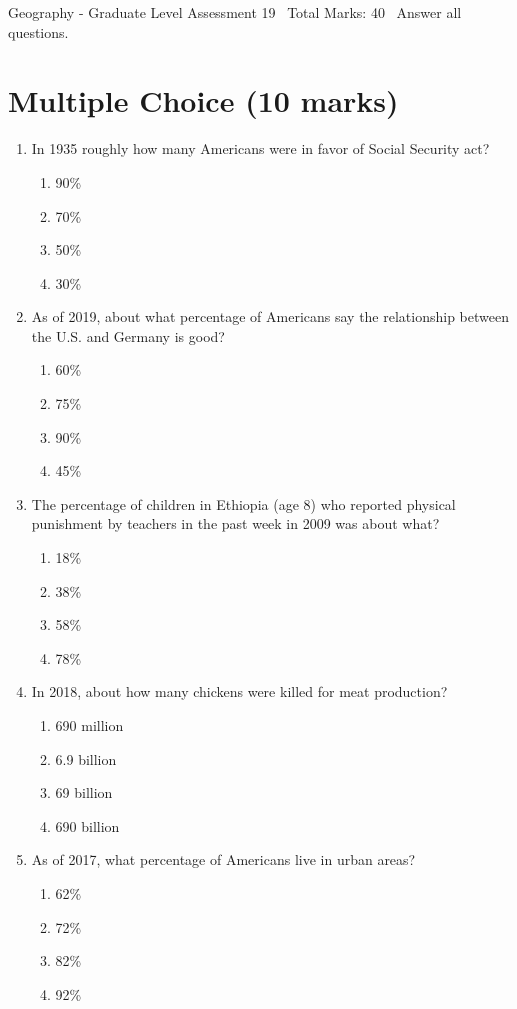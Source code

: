 \documentclass[12pt]{article}
\begin{document}
\begin{center}
Geography - Graduate Level Assessment 19 \
Total Marks: 40 \
Answer all questions.
\end{center}

\section*{Multiple Choice (10 marks)}
\begin{enumerate}[label=\arabic*.]
\item In 1935 roughly how many Americans were in favor of Social Security act?
\begin{enumerate}[label=(\alph*)]
    \item 90\%
    \item 70\%
    \item 50\%
    \item 30\%
\end{enumerate}
\item As of 2019, about what percentage of Americans say the relationship between the U.S. and Germany is good?
\begin{enumerate}[label=(\alph*)]
    \item 60\%
    \item 75\%
    \item 90\%
    \item 45\%
\end{enumerate}
\item The percentage of children in Ethiopia (age 8) who reported physical punishment by teachers in the past week in 2009 was about what?
\begin{enumerate}[label=(\alph*)]
    \item 18\%
    \item 38\%
    \item 58\%
    \item 78\%
\end{enumerate}
\item In 2018, about how many chickens were killed for meat production?
\begin{enumerate}[label=(\alph*)]
    \item 690 million
    \item 6.9 billion
    \item 69 billion
    \item 690 billion
\end{enumerate}
\item As of 2017, what percentage of Americans live in urban areas?
\begin{enumerate}[label=(\alph*)]
    \item 62\%
    \item 72\%
    \item 82\%
    \item 92\%
\end{enumerate}
\end{enumerate}
\end{document}
